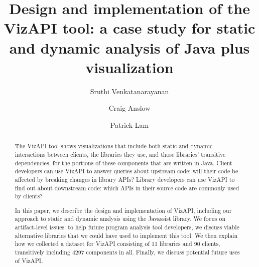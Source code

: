 \documentclass[3p,times]{elsarticle}
\begin{document}
\begin{frontmatter}




  \title{Design and implementation of the VizAPI tool: a case study for static and dynamic analysis of Java plus visualization}

  

\author{Sruthi Venkatanarayanan}
\author{Craig Anslow}
\author{Patrick Lam}

\address{}

\begin{abstract}
  The VizAPI tool shows visualizations that include both static and dynamic interactions between clients, the libraries they use, and those libraries’ transitive dependencies, for the portions of these components that are written in Java. Client developers can use VizAPI to answer queries about upstream code: will their code be affected by breaking changes in library APIs? Library developers can use VizAPI to find out about downstream code: which APIs in their source code are commonly used by clients?

In this paper, we describe the design and implementation of VizAPI, including our approach to static and dynamic analysis using the Javassist library. We focus on artifact-level issues: to help future program analysis tool developers, we discuss viable alternative libraries that we could have used to implement this tool. We then explain how we collected a dataset for VizAPI consisting of 11 libraries and 90 clients, transitively including 4297 components in all. Finally, we discuss potential future uses of VizAPI.
\end{abstract}


\end{frontmatter}
\end{document}

